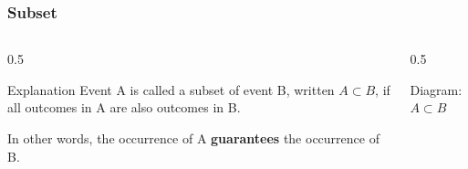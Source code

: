 \begin{frame}
    \frametitle{Subset}
    
    \begin{columns}[T]
        \begin{column}{0.5\textwidth}
            \begin{block}{Explanation}
                Event A is called a subset of event B, written \(A \subset B\), if all outcomes in A are also outcomes in B.
                \vspace{1cm}
                
                In other words, the occurrence of A \textbf{guarantees} the occurrence of B.
            \end{block}
        \end{column}
        
        \begin{column}{0.5\textwidth}
            \begin{block}{Diagram: \(A \subset B\)}
                \centering
            \end{block}
        \end{column}
    \end{columns}
\end{frame}

